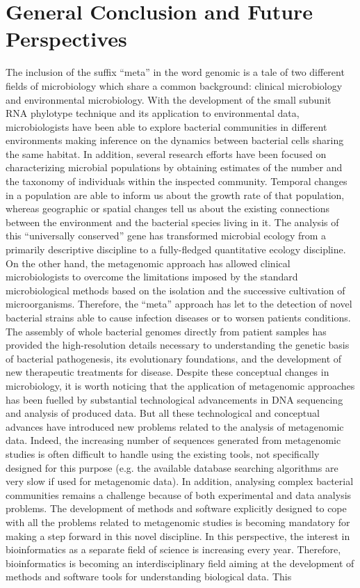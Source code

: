 \logvartrue
\chapter{General Conclusion and Future Perspectives}
The inclusion of the suffix ``meta'' in the word genomic is a tale of two different fields of microbiology which share a common background: clinical microbiology and environmental microbiology. With the development of the small subunit RNA phylotype technique and its application to environmental data, microbiologists have been able to explore bacterial communities in different environments making inference on the dynamics between bacterial cells sharing the same habitat. In addition, several research efforts have been focused on characterizing microbial populations by obtaining estimates of the number and the taxonomy of individuals within the inspected community. Temporal changes in a population are able to inform us about the growth rate of that population, whereas geographic or spatial changes tell us about the existing connections between the environment and the bacterial species living in it. The analysis of this ``universally conserved'' gene has transformed microbial ecology from a primarily descriptive discipline to a fully-fledged quantitative ecology discipline. On the other hand, the metagenomic approach has allowed clinical microbiologists to overcome the limitations imposed by the standard microbiological methods based on the isolation and the successive cultivation of microorganisms. Therefore, the ``meta'' approach has let to the detection of novel bacterial strains able to cause infection diseases or to worsen patients conditions. The assembly of whole bacterial genomes directly from patient samples has provided the high-resolution details necessary to understanding the genetic basis of bacterial pathogenesis, its evolutionary foundations, and the development of new therapeutic treatments for disease. Despite these conceptual changes in microbiology, it is worth noticing that the application of metagenomic approaches has been fuelled by substantial technological advancements in DNA sequencing and analysis of produced data. But all these technological and conceptual advances have introduced new problems related to the analysis of metagenomic data. Indeed, the increasing number of sequences generated from metagenomic studies is often difficult to handle using the existing tools, not specifically designed for this purpose (e.g. the available database searching algorithms are very slow if used for metagenomic data). In addition, analysing complex bacterial communities remains a challenge because of both experimental and data analysis problems. The development of methods and software explicitly designed to cope with all the problems related to metagenomic studies is becoming mandatory for making a step forward in this novel discipline. In this perspective, the interest in bioinformatics as a separate field of science is increasing every year. Therefore, bioinformatics is becoming an interdisciplinary field aiming at the development of methods and software tools for understanding biological data. This 
